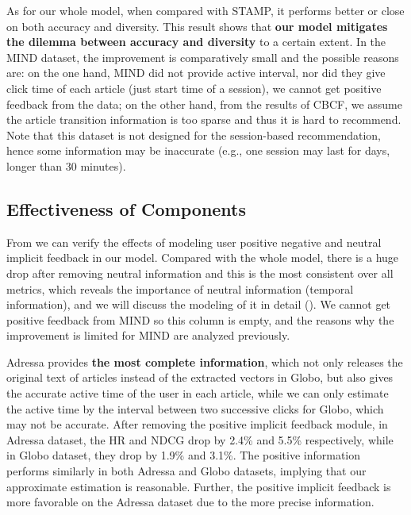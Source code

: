 As for our whole model, when compared with STAMP, it performs better or close on both accuracy and diversity. This result shows that \textbf{our model mitigates the dilemma between accuracy and diversity} 
to a certain extent. In the MIND dataset, 
the improvement is comparatively small and the possible reasons are: 
on the one hand, MIND did not provide active interval, nor did they give click time of each article (just start time of a session), 
we cannot get positive feedback from the data; on the other hand, from the results of CBCF, 
we assume the article transition information is too sparse and thus it is hard to recommend. 
Note that this dataset is not designed for the session-based recommendation, hence some information 
may be inaccurate (e.g., one session may last for days, longer than 30 minutes).

\subsection{Effectiveness of Components}
From  we can verify the effects of modeling user positive negative and neutral implicit feedback in our model. Compared with the whole model, there is a huge drop after removing neutral information and this is the most consistent over all metrics, which reveals the importance of neutral information (temporal information), and we will discuss the modeling of it in detail (). We cannot get positive feedback from MIND so this column is empty, and the reasons why the improvement is limited for MIND are analyzed previously.

Adressa provides \textbf{the most complete information}, which not only releases the original 
text of articles instead of the extracted vectors in Globo, but also gives the accurate active time 
of the user in each article, while we can only estimate the active time by the interval between 
two successive clicks for Globo, which may not be accurate. After removing the positive implicit feedback module, in Adressa dataset, the HR and NDCG drop by 2.4\% and 5.5\% respectively, while in Globo dataset, they drop by 1.9\% and 3.1\%. The positive information performs similarly in both Adressa and Globo datasets, implying that our approximate estimation is reasonable. Further, the positive implicit feedback is more favorable on the Adressa dataset due to the more precise information.


